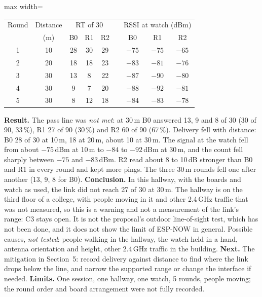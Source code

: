 \IfFileExists{IEEEtran.cls}{\documentclass[conference]{IEEEtran}}{\documentclass[10pt,twocolumn]{article}}
\newcommand{\fitcol}[1]{\begin{adjustbox}{max width=\columnwidth}#1\end{adjustbox}}
\begin{document}
\begin{center}\footnotesize\setlength{\tabcolsep}{4pt}
\fitcol{\begin{tabular}{@{}c c ccc c ccc@{}}
\toprule
Round & Distance & \multicolumn{3}{c}{RT of 30} & & \multicolumn{3}{c}{RSSI at watch (dBm)}\\
 & (m) & B0 & R1 & R2 & & B0 & R1 & R2\\
\midrule
1 & 10 & 28 & 30 & 29 & & $-75$ & $-75$ & $-65$\\
2 & 20 & 18 & 18 & 23 & & $-83$ & $-81$ & $-76$\\
3 & 30 & 13 & 8 & 22 & & $-87$ & $-90$ & $-80$\\
4 & 30 & 9 & 7 & 20 & & $-88$ & $-92$ & $-81$\\
5 & 30 & 8 & 12 & 18 & & $-84$ & $-83$ & $-78$\\
\bottomrule
\end{tabular}}
\end{center}
\textbf{Result.} The pass line was \emph{not met}: at 30\,m B0 answered 13, 9 and 8 of 30 (30 of 90, 33\,\%), R1 27 of 90 (30\,\%) and R2 60 of 90 (67\,\%). Delivery fell with distance: B0 28 of 30 at 10\,m, 18 at 20\,m, about 10 at 30\,m. The signal at the watch fell from about $-75$\,dBm at 10\,m to $-84$ to $-92$\,dBm at 30\,m, and the count fell sharply between $-75$ and $-83$\,dBm. R2 read about 8 to 10\,dB stronger than B0 and R1 in every round and kept more pings. The three 30\,m rounds fell one after another (13, 9, 8 for B0). \textbf{Conclusion.} In this hallway, with the boards and watch as used, the link did not reach 27 of 30 at 30\,m. The hallway is on the third floor of a college, with people moving in it and other 2.4\,GHz traffic that was not measured, so this is a warning and not a measurement of the link's range: C3 stays open. It is not the proposal's outdoor line-of-sight test, which has not been done, and it does not show the limit of ESP-NOW in general. Possible causes, \emph{not tested}: people walking in the hallway, the watch held in a hand, antenna orientation and height, other 2.4\,GHz traffic in the building. \textbf{Next.} The mitigation in Section~5: record delivery against distance to find where the link drops below the line, and narrow the supported range or change the interface if needed. \textbf{Limits.} One session, one hallway, one watch, 5 rounds, people moving; the round order and board arrangement were not fully recorded.
\end{document}
